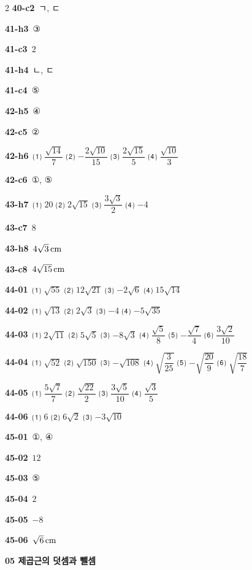 \documentclass[10pt,a4paper]{article}
\begin{document}
\begin{multicols}{2}
\noindent\textbf{40-c2}\ ㄱ, ㄷ\par
\noindent\textbf{41-h3}\ ③\par
\noindent\textbf{41-c3}\ $2$\par
\noindent\textbf{41-h4}\ ㄴ, ㄷ\par
\noindent\textbf{41-c4}\ ⑤\par
\noindent\textbf{42-h5}\ ④\par
\noindent\textbf{42-c5}\ ②\par
\noindent\textbf{42-h6}\ ⑴ $\dfrac{\sqrt{14}}{7}$ ⑵ $-\dfrac{2\sqrt{10}}{15}$ ⑶ $\dfrac{2\sqrt{15}}{5}$ ⑷ $\dfrac{\sqrt{10}}{3}$\par
\noindent\textbf{42-c6}\ ①, ⑤\par
\noindent\textbf{43-h7}\ ⑴ $20$ ⑵ $2\sqrt{15}$ ⑶ $\dfrac{3\sqrt{3}}{2}$ ⑷ $-4$\par
\noindent\textbf{43-c7}\ $8$\par
\noindent\textbf{43-h8}\ $4\sqrt{3}\mkern3mu \mathrm{cm}$\par
\noindent\textbf{43-c8}\ $4\sqrt{15}\mkern3mu \mathrm{cm}$\par
\noindent\textbf{44-01}\ ⑴ $\sqrt{55}$ ⑵ $12\sqrt{21}$ ⑶ $-2\sqrt{6}$ ⑷ $15\sqrt{14}$\par
\noindent\textbf{44-02}\ ⑴ $\sqrt{13}$ ⑵ $2\sqrt{3}$ ⑶ $-4$ ⑷ $-5\sqrt{35}$\par
\noindent\textbf{44-03}\ ⑴ $2\sqrt{11}$ ⑵ $5\sqrt{5}$ ⑶ $-8\sqrt{3}$ ⑷ $\dfrac{\sqrt{5}}{8}$ ⑸ $-\dfrac{\sqrt{7}}{4}$ ⑹ $\dfrac{3\sqrt{2}}{10}$\par
\noindent\textbf{44-04}\ ⑴ $\sqrt{52}$ ⑵ $\sqrt{150}$ ⑶ $-\sqrt{108}$ ⑷ $\sqrt{\dfrac{3}{25}}$ ⑸ $-\sqrt{\dfrac{20}{9}}$ ⑹ $\sqrt{\dfrac{18}{7}}$\par
\noindent\textbf{44-05}\ ⑴ $\dfrac{5\sqrt{7}}{7}$ ⑵ $\dfrac{\sqrt{22}}{2}$ ⑶ $\dfrac{3\sqrt{5}}{10}$ ⑷ $\dfrac{\sqrt{3}}{5}$\par
\noindent\textbf{44-06}\ ⑴ $6$ ⑵ $6\sqrt{2}$ ⑶ $-3\sqrt{10}$\par
\noindent\textbf{45-01}\ ①, ④\par
\noindent\textbf{45-02}\ $12$\par
\noindent\textbf{45-03}\ ⑤\par
\noindent\textbf{45-04}\ $2$\par
\noindent\textbf{45-05}\ $-8$\par
\noindent\textbf{45-06}\ $\sqrt{6}\mkern3mu \mathrm{cm}$\par
\noindent\textbf{05 제곱근의 덧셈과 뺄셈}\par\smallskip

\end{multicols}
\end{document}
